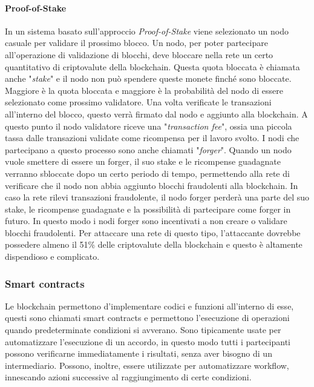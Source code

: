 \documentclass[a4paper]{article}
\begin{document}
    \paragraph{Proof-of-Stake}
    In un sistema basato sull'approccio \emph{Proof-of-Stake} viene selezionato un nodo casuale per validare il prossimo blocco. Un nodo, per poter partecipare all'operazione di validazione di blocchi, deve bloccare nella rete un certo quantitativo di criptovalute della blockchain. Questa quota bloccata è chiamata anche "\emph{stake}" e il nodo
    non può spendere queste monete finché sono bloccate. Maggiore è la quota bloccata e maggiore è la probabilità del nodo di essere selezionato come prossimo validatore. Una volta verificate le transazioni all'interno del blocco, questo verrà firmato dal nodo e aggiunto alla blockchain. A questo punto
    il nodo validatore riceve una "\emph{transaction fee}", ossia una piccola tassa dalle transazioni validate come ricompensa per il lavoro svolto. I nodi che partecipano a questo processo sono anche chiamati "\emph{forger}". Quando un nodo vuole smettere di essere un forger, il suo stake e le ricompense guadagnate verranno sbloccate dopo un certo periodo di tempo, permettendo
    alla rete di verificare che il nodo non abbia aggiunto blocchi fraudolenti alla blockchain. In caso la rete rilevi transazioni fraudolente, il nodo forger perderà una parte del suo stake, le ricompense guadagnate e la possibilità di partecipare come forger in futuro. In questo modo i nodi forger sono incentivati a non creare o validare blocchi fraudolenti.
    Per attaccare una rete di questo tipo, l'attaccante dovrebbe possedere almeno il 51\% delle criptovalute della blockchain e questo è altamente dispendioso e complicato.

    \subsubsection{Smart contracts}
    Le blockchain permettono d'implementare codici e funzioni all'interno di esse, questi sono chiamati smart contracts e permettono l'esecuzione di operazioni quando predeterminate condizioni si avverano.
    Sono tipicamente usate per automatizzare l'esecuzione di un accordo, in questo modo tutti i partecipanti possono verificarne immediatamente i risultati, senza aver bisogno di un intermediario.
    Possono, inoltre, essere utilizzate per automatizzare workflow, innescando azioni successive al raggiungimento di certe condizioni\cite{smartcontracts}.
    
\end{document}
